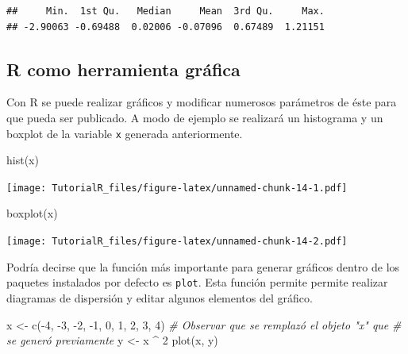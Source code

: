 \documentclass[
]{book}
\newenvironment{Shaded}{\begin{snugshade}}{\end{snugshade}}
\newcommand{\CommentTok}[1]{\textcolor[rgb]{0.56,0.35,0.01}{\textit{#1}}}
\newcommand{\DecValTok}[1]{\textcolor[rgb]{0.00,0.00,0.81}{#1}}
\newcommand{\FunctionTok}[1]{\textcolor[rgb]{0.00,0.00,0.00}{#1}}
\newcommand{\NormalTok}[1]{#1}
\newcommand{\OtherTok}[1]{\textcolor[rgb]{0.56,0.35,0.01}{#1}}
\newcommand{\SpecialCharTok}[1]{\textcolor[rgb]{0.00,0.00,0.00}{#1}}
\begin{document}
\begin{verbatim}
##     Min.  1st Qu.   Median     Mean  3rd Qu.     Max. 
## -2.90063 -0.69488  0.02006 -0.07096  0.67489  1.21151
\end{verbatim}

\hypertarget{r-como-herramienta-gruxe1fica}{%
\subsection{R como herramienta gráfica}\label{r-como-herramienta-gruxe1fica}}

Con R se puede realizar gráficos y modificar numerosos parámetros de éste para
que pueda ser publicado. A modo de ejemplo se realizará un histograma y un
boxplot de la variable \texttt{x} generada anteriormente.

\begin{Shaded}
\begin{Highlighting}[]
\FunctionTok{hist}\NormalTok{(x)}
\end{Highlighting}
\end{Shaded}

\texttt{[image: TutorialR\_files/figure-latex/unnamed-chunk-14-1.pdf]}

\begin{Shaded}
\begin{Highlighting}[]
\FunctionTok{boxplot}\NormalTok{(x)}
\end{Highlighting}
\end{Shaded}

\texttt{[image: TutorialR\_files/figure-latex/unnamed-chunk-14-2.pdf]}

Podría decirse que la función más importante para generar gráficos dentro de
los paquetes instalados por defecto es \texttt{plot}. Esta función permite permite
realizar diagramas de dispersión y editar algunos elementos del gráfico.

\begin{Shaded}
\begin{Highlighting}[]
\NormalTok{x }\OtherTok{\textless{}{-}}
  \FunctionTok{c}\NormalTok{(}\SpecialCharTok{{-}}\DecValTok{4}\NormalTok{, }\SpecialCharTok{{-}}\DecValTok{3}\NormalTok{, }\SpecialCharTok{{-}}\DecValTok{2}\NormalTok{, }\SpecialCharTok{{-}}\DecValTok{1}\NormalTok{, }\DecValTok{0}\NormalTok{, }\DecValTok{1}\NormalTok{, }\DecValTok{2}\NormalTok{, }\DecValTok{3}\NormalTok{, }\DecValTok{4}\NormalTok{)  }\CommentTok{\# Observar que se remplazó el objeto "x" que}
                                    \CommentTok{\# se generó previamente}
\NormalTok{y }\OtherTok{\textless{}{-}}\NormalTok{ x }\SpecialCharTok{\^{}} \DecValTok{2}
\FunctionTok{plot}\NormalTok{(x, y)}
\end{Highlighting}
\end{Shaded}
\end{document}
